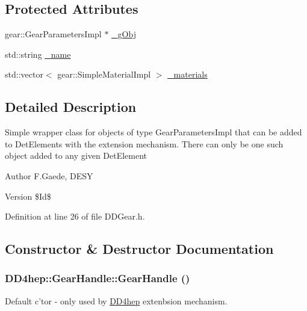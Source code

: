 \subsection*{Protected Attributes}
\begin{DoxyCompactItemize}
\item 
gear::GearParametersImpl $\ast$ \hyperlink{class_d_d4hep_1_1_gear_handle_a211b76e59d3561a189c0f5b3b7186d08}{\_\-gObj}
\item 
std::string \hyperlink{class_d_d4hep_1_1_gear_handle_a73f13b4c51b157ad9ff56335a5063d3b}{\_\-name}
\item 
std::vector$<$ gear::SimpleMaterialImpl $>$ \hyperlink{class_d_d4hep_1_1_gear_handle_a7a666fef6469ba28d864d41e16000c29}{\_\-materials}
\end{DoxyCompactItemize}


\subsection{Detailed Description}
Simple wrapper class for objects of type GearParametersImpl that can be added to DetElements with the extension mechanism. There can only be one such object added to any given DetElement \begin{DoxyAuthor}{Author}
F.Gaede, DESY 
\end{DoxyAuthor}
\begin{DoxyVersion}{Version}
\$Id\$ 
\end{DoxyVersion}


Definition at line 26 of file DDGear.h.

\subsection{Constructor \& Destructor Documentation}
\hypertarget{class_d_d4hep_1_1_gear_handle_a782739bfe116441082e6b4597bb6bf6e}{
\subsubsection[{GearHandle}]{\setlength{\rightskip}{0pt plus 5cm}DD4hep::GearHandle::GearHandle ()}}
\label{class_d_d4hep_1_1_gear_handle_a782739bfe116441082e6b4597bb6bf6e}
Default c'tor -\/ only used by \hyperlink{namespace_d_d4hep}{DD4hep} extenbsion mechanism. 

